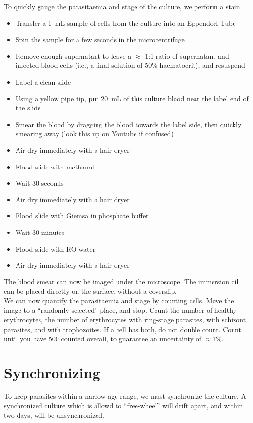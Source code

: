 \documentclass{article}
\begin{document}
To quickly gauge the parasitaemia and stage of the culture, we perform a stain.

\begin{itemize}
	\item Transfer a \SI{1}{mL} sample of cells from the culture into an Eppendorf Tube
	\item Spin the sample for a few seconds in the microcentrifuge
	\item Remove enough supernatant to leave a $\approx$ 1:1 ratio of supernatant and infected blood cells (i.e., a final solution of 50\% haematocrit), and resuspend
	\item Label a clean slide
	\item Using a yellow pipe tip, put \SI{20}{mL} of this culture blood near the label end of the slide
	\item Smear the blood by dragging the blood towards the label side, then quickly smearing away (look this up on Youtube if confused)
	\item Air dry immediately with a hair dryer
	\item Flood slide with methanol
	\item Wait 30 seconds
	\item Air dry immediately with a hair dryer
	\item Flood slide with Giemsa in phosphate buffer
	\item Wait 30 minutes
	\item Flood slide with RO water
	\item Air dry immediately with a hair dryer
\end{itemize}

The blood smear can now be imaged under the microscope. The immersion oil can be placed directly on the surface, without a coverslip.\\

We can now quantify the parasitaemia and stage by counting cells. Move the image to a ``randomly selected'' place, and stop. Count the number of healthy erythrocytes, the number of erythrocytes with ring-stage parasites, with schizont parasites, and with trophozoites. If a cell has both, do not double count. Count until you have 500 counted overall, to guarantee an uncertainty of $\approx 1\%$.

\newpage
\section{Synchronizing}

To keep parasites within a narrow age range, we must synchronize the culture. A synchronized culture which is allowd to ``free-wheel'' will drift apart, and within two days, will be unsynchronized.\\
\end{document}
